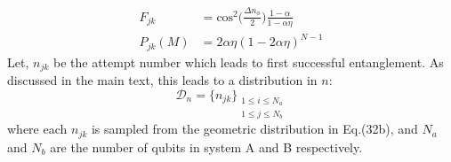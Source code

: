 \begin{subequations}
    \begin{align}
        F_{jk} &= \text{cos}^{2}\bigg(\frac{\Delta n_{\phi}}{2}\bigg)\frac{1-\alpha}{1-\alpha\eta}\\
        P_{jk}(M) &= 2\alpha\eta(1-2\alpha\eta)^{N-1}
    \end{align}
\end{subequations} 
Let, $n_{jk}$ be the attempt number which leads to first successful entanglement. As discussed in the main text, this leads to a distribution in $n$:
\begin{equation}
\mathcal{D}_{n} = \{n_{jk}\}_{\substack{1\leq i \leq N_{a} \\ 1 \leq j \leq N_{b}}}
\end{equation}
where each $n_{jk}$ is sampled from the geometric distribution in Eq.(32b), and $N_{a}$ and $N_{b}$ are the number of qubits in system A and B respectively.
